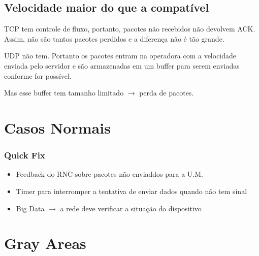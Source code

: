 \documentclass[brazil]{beamer}
\begin{document}
\subsection{Velocidade maior do que a compatível}

\begin{frame}[fragile]
    TCP tem controle de fluxo, portanto, pacotes não recebidos não devolvem ACK. Assim, não são tantos pacotes perdidos e a diferença não é tão grande.
    
\end{frame}

\begin{frame}[fragile]
    UDP não tem. Portanto os pacotes entram na operadora com a velocidade enviada pelo servidor e são armazenadas em um buffer para serem enviadas conforme for possível. 

    \vspace{0.3cm}
    Mas esse buffer tem tamanho limitado $\rightarrow$ perda de pacotes.
\end{frame}

\section{Casos Normais}



\begin{frame}[fragile]
        \frametitle{Quick Fix}
        \begin{itemize}
            \item Feedback do RNC sobre pacotes não enviaddos para a U.M.
            \item Timer para interromper a tentativa de enviar dados quando não tem sinal
            \item Big Data $\rightarrow$ a rede deve verificar a situação do dispositivo
        \end{itemize}
\end{frame}

\section{Gray Areas}
\end{document}

